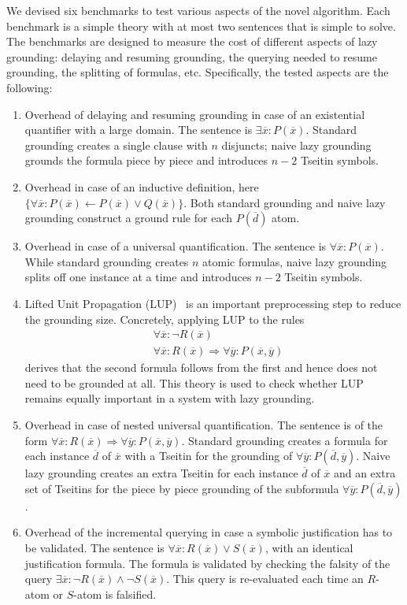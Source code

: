 \documentclass[11pt]{article}
\newcommand{\m}[1]{\ensuremath{#1}\xspace}
\newcommand{\limplies}{\m{\Rightarrow}}
\newcommand{\lrule}{\m{\leftarrow}}
\newcommand{\xxx}{\m{\overline{x}}}
\newcommand{\yyy}{\m{\overline{y}}}
\newcommand{\ddd}{\m{\overline{d}}}
\theoremstyle{plain}
\theoremstyle{definition}
\theoremstyle{example_basic}
\theoremstyle{example_contd}
\theoremstyle{plain}
\newcommand{\change}[1]{#1}
\begin{document}
We devised six benchmarks to test various aspects of the novel algorithm. Each benchmark is a simple theory with at most two sentences that is simple to solve. The benchmarks are designed to measure the cost of different aspects of lazy grounding:  delaying and resuming grounding, the  querying needed to resume grounding,  the  splitting of formulas, etc. Specifically, the tested aspects are the following:
\begin{enumerate}
\item \change{Overhead of delaying and resuming grounding in case of
    an existential quantifier with a large domain. The sentence is
    $\exists \xxx: P(\xxx)$. Standard grounding creates a single
    clause with $n$ disjuncts; naive lazy grounding grounds the
    formula piece by piece and introduces $n-2$ Tseitin symbols.}
\item \change{Overhead in case of an inductive definition, here
    $\{\forall \xxx: P(\xxx) \lrule P(\xxx) \lor Q(\xxx)\}$. Both
    standard grounding and naive lazy grounding construct a ground
    rule for each $P(\ddd)$ atom.}
\item \change{Overhead in case of a universal quantification. The
    sentence is $\forall \xxx: P(\xxx)$. While standard grounding
    creates $n$ atomic formulas, naive lazy grounding splits off one
    instance at a time and introduces $n-2$ Tseitin symbols.}
\item \change{Lifted Unit Propagation
    (LUP)~\cite{jair/WittocxMD10,acm/wittocx} is an important preprocessing step to reduce the grounding size. Concretely, applying LUP to the rules}
  \begin{align*}
    &\forall \xxx: \lnot R(\xxx) \\
    &\forall \xxx: R(\xxx) \limplies \forall \yyy: P(\xxx, \yyy)
  \end{align*}
  \change{derives that the second formula follows from the first and
    hence does not need to be grounded at all. This theory is used to
    check whether LUP remains equally important in a system with lazy
    grounding.}
\item \change{Overhead in case of nested universal quantification. The
  sentence is of the form $\forall \xxx: R(\xxx) \limplies \forall
  \yyy: P(\xxx, \yyy)$. Standard grounding creates a formula for each
  instance $\ddd$ of $\xxx$ with a Tseitin for the grounding of $\forall
  \yyy: P(\ddd, \yyy)$. Naive lazy grounding creates an extra
  Tseitin for each instance $\ddd$ of $\xxx$ and an extra set of
  Tseitins for the piece by piece grounding of the subformula $\forall
  \yyy: P(\ddd, \yyy)$.}
\item \change{Overhead of the incremental querying in case a symbolic justification has to be validated. The sentence is $\forall \xxx: R(\xxx) \lor S(\xxx)$, with an identical justification formula. The formula is validated by checking the falsity of the query $\exists \xxx: \neg R(\xxx)\land\neg S(\xxx)$. This query is re-evaluated each time an $R$-atom or $S$-atom is falsified.}
\end{enumerate}
\end{document}
